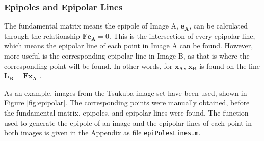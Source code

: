 \documentclass[a4paper, 10pt, conference]{ieeeconf}
\begin{document}
\subsubsection{Epipoles and Epipolar Lines}
The fundamental matrix means the epipole of Image A, $\textbf{e}_\textbf{A}$, can be calculated through the relationship $\textbf{Fe}_\textbf{A} = 0$. This is the intersection of every epipolar line, which means the epipolar line of each point in Image A can be found. However, more useful is the corresponding epipolar line in Image B, as that is where the corresponding point will be found. In other words, for $\textbf{x}_\textbf{A}$, $\textbf{x}_\textbf{B}$ is found on the line $\textbf{L}_\textbf{B}=\textbf{Fx}_\textbf{A}$ \cite{mit}.

As an example, images from the Tsukuba image set \cite{tsukuba} have been used, shown in Figure \ref{fig:epipolar}. The corresponding points were manually obtained, before the fundamental matrix, epipoles, and epipolar lines were found. The function used to generate the epipole of an image and the epipolar lines of each point in both images is given in the Appendix as file \texttt{epiPolesLines.m}.
\end{document}
